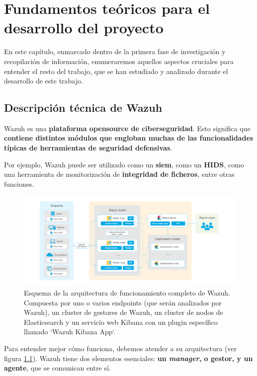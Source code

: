 \chapter{Fundamentos teóricos para el desarrollo del proyecto}\label{cap:Fundamentos}

En este capítulo, enmarcado dentro de la primera fase de investigación y recopilación de información, enumeraremos aquellos aspectos cruciales para entender el resto del trabajo, que se han estudiado y analizado durante el desarrollo de este trabajo.

\section{Descripción técnica de Wazuh}

Wazuh es una \textbf{plataforma opensource de ciberseguridad}. Esto significa que \textbf{contiene distintos módulos que engloban muchas de las funcionalidades típicas de herramientas de seguridad defensivas}. 

Por ejemplo, Wazuh puede ser utilizado como un \textbf{\gls{siem}}, como un \textbf{\gls{HIDS}}, como una herramienta de monitorización de \textbf{integridad de ficheros}, entre otras funciones.

\begin{figure}[!hbt]
  \centering
  \includegraphics[width=\textwidth]{imagenes/wazuh_architecture.png}
  \caption{Esquema de la arquitectura de funcionamiento completo de Wazuh. Compuesta por uno o varios endpoints (que serán analizados por Wazuh), un cluster de gestores de Wazuh, un cluster de nodos de Elasticsearch y un servicio web Kibana con un plugin específico llamado `Wazuh Kibana App`. }
  \label{wazuh_architecture}
\end{figure}

Para entender mejor cómo funciona, debemos atender a su arquitectura (ver figura \ref{wazuh_architecture}). Wazuh tiene dos elementos esenciales: \textbf{un \textit{manager}, o gestor, y un agente}, que se comunican entre sí. 

